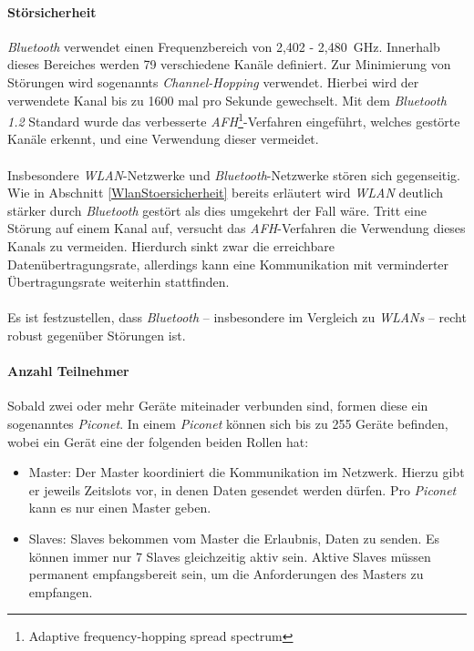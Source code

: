             \paragraph{Störsicherheit}
                \emph{Bluetooth} verwendet einen Frequenzbereich von 2,402 - 2,480~GHz. Innerhalb
                dieses Bereiches werden 79 verschiedene Kanäle definiert. Zur Minimierung
                von Störungen wird sogenannts \textsl{Channel-Hopping} verwendet. Hierbei
                wird der verwendete Kanal bis zu 1600 mal pro Sekunde gewechselt. Mit dem
                \emph{Bluetooth 1.2} Standard wurde das verbesserte  
                \emph{AFH}\footnote{Adaptive frequency-hopping spread spectrum}-Verfahren 
                eingeführt, welches gestörte Kanäle erkennt, und eine Verwendung
                dieser vermeidet.\\
                \\
                Insbesondere \emph{WLAN}-Netzwerke und \emph{Bluetooth}-Netzwerke stören sich 
                gegenseitig. Wie in Abschnitt \ref{WlanStoersicherheit} bereits
                erläutert wird \emph{WLAN} deutlich stärker durch \emph{Bluetooth} gestört
                als dies umgekehrt der Fall wäre. Tritt eine Störung auf einem
                Kanal auf, versucht das \emph{AFH}-Verfahren die Verwendung dieses
                Kanals zu vermeiden. Hierdurch sinkt zwar die erreichbare
                Datenübertragungsrate, allerdings kann eine Kommunikation mit
                verminderter Übertragungsrate weiterhin stattfinden.\\
                 \\
                 Es ist festzustellen, dass \emph{Bluetooth} -- insbesondere im Vergleich
                 zu \emph{WLANs} -- recht robust gegenüber Störungen ist.

            \paragraph{Anzahl Teilnehmer}
                Sobald zwei oder mehr Geräte miteinader verbunden sind, formen diese ein
                sogenanntes \emph{Piconet}. In einem \emph{Piconet} können sich bis
                zu 255 Geräte befinden, wobei ein Gerät eine der folgenden beiden Rollen
                hat:

                \begin{itemize}
                    \item{Master:} Der Master koordiniert die Kommunikation im Netzwerk.
                                   Hierzu gibt er jeweils Zeitslots vor, in denen
                                   Daten gesendet werden dürfen. Pro \emph{Piconet} kann
                                   es nur einen Master geben.
                    \item{Slaves:} Slaves bekommen vom Master die Erlaubnis, Daten zu senden.
                                   Es können immer nur 7 Slaves gleichzeitig aktiv sein.
                                   Aktive Slaves müssen permanent empfangsbereit sein,
                                   um die Anforderungen des Masters zu empfangen. 
                \end{itemize}

